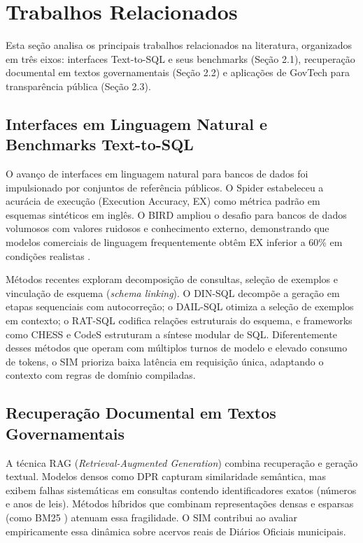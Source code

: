 \documentclass[12pt]{article}
\begin{document}
\section{Trabalhos Relacionados}

Esta seção analisa os principais trabalhos relacionados na literatura, organizados em três eixos: interfaces Text-to-SQL e seus benchmarks (Seção 2.1), recuperação documental em textos governamentais (Seção 2.2) e aplicações de GovTech para transparência pública (Seção 2.3).

\subsection{Interfaces em Linguagem Natural e Benchmarks Text-to-SQL}

O avanço de interfaces em linguagem natural para bancos de dados foi impulsionado por conjuntos de referência públicos. O Spider \cite{Yu2018Spider} estabeleceu a acurácia de execução (Execution Accuracy, EX) como métrica padrão em esquemas sintéticos em inglês. O BIRD \cite{Li2024BIRD} ampliou o desafio para bancos de dados volumosos com valores ruidosos e conhecimento externo, demonstrando que modelos comerciais de linguagem frequentemente obtêm EX inferior a 60\% em condições realistas \cite{Li2024BIRD,Pourreza2024DIN,Zheng2026GovLLM}.

Métodos recentes exploram decomposição de consultas, seleção de exemplos e vinculação de esquema (\textit{schema linking}). O DIN-SQL \cite{Pourreza2024DIN} decompõe a geração em etapas sequenciais com autocorreção; o DAIL-SQL \cite{Gao2024DAILSQL} otimiza a seleção de exemplos em contexto; o RAT-SQL \cite{Wang2020RATSQL} codifica relações estruturais do esquema, e frameworks como CHESS \cite{Talaei2024CHESS} e CodeS \cite{Qu2025CodeS} estruturam a síntese modular de SQL. Diferentemente desses métodos que operam com múltiplos turnos de modelo e elevado consumo de tokens, o SIM prioriza baixa latência em requisição única, adaptando o contexto com regras de domínio compiladas.

\subsection{Recuperação Documental em Textos Governamentais}

A técnica RAG (\textit{Retrieval-Augmented Generation}) \cite{Lewis2020RAG,Gao2024RAGSurvey,Asai2024SelfRAG,Sharma2025RAGSurvey,Chen2026RAGGovTech} combina recuperação e geração textual. Modelos densos como DPR \cite{Karpukhin2020DPR} capturam similaridade semântica, mas exibem falhas sistemáticas em consultas contendo identificadores exatos (números e anos de leis). Métodos híbridos que combinam representações densas e esparsas (como BM25 \cite{Robertson2009BM25,Lin2021Hybrid,Lin2021Pyserini}) atenuam essa fragilidade. O SIM contribui ao avaliar empiricamente essa dinâmica sobre acervos reais de Diários Oficiais municipais.
\end{document}
